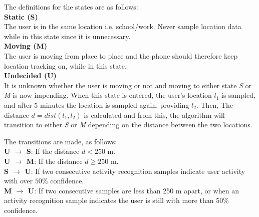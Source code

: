 The definitions for the states are as follows:\\

\textbf{Static (S)}\\
The user is in the same location i.e. school/work. Never sample location data while in this state since it is unnecessary.\\

\textbf{Moving (M)}\\
The user is moving from place to place and the phone should therefore keep location tracking on, while in this state.\\

\textbf{Undecided (U)}\\
It is unknown whether the user is moving or not and moving to either state \textit{S} or \textit{M} is now impending. When this state is entered, the user's location $l_1$ is sampled, and after 5 minutes the location is sampled again, providing $l_2$. Then,  The distance $d = dist(l_1, l_2)$ is calculated and from this, the algorithm will transition to either \textit{S} or \textit{M} depending on the distance between the two locations.

The transitions are made, as follows:\\

\textbf{U $\rightarrow$ S}: If the distance $d < 250$ m.\\

\textbf{U $\rightarrow$ M}: If the distance $d \geq 250$ m.\\

\textbf{S $\rightarrow$ U}: If two consecutive activity recognition samples indicate user activity with over $50\%$ confidence.\\

\textbf{M $\rightarrow$  U}: If two consecutive samples are less than 250 m apart, or when an activity recognition sample indicates the user is still with more than 50\% confidence.\\